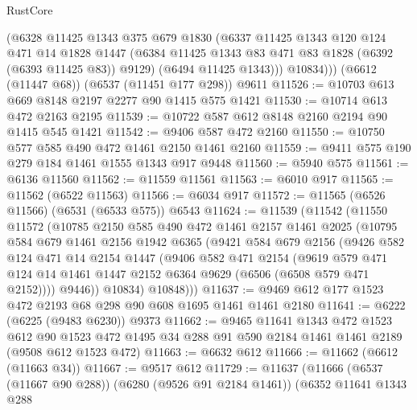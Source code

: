 \begin{lexlean}{RustCore}
\begin{coremodule}
          (@6328
            @11425
            @1343
            @375
            @679
            @1830
            (@6337
              @11425
              @1343
              @120
              @124
              @471
              @14
              @1828
              @1447
              (@6384 @11425 @1343 @83 @471 @83 @1828 (@6392 (@6393 @11425 @83)) @9129)
              (@6494 @11425 @1343)))
          @10834)))
    (@6612 (@11447 @68))
    (@6537 (@11451 @177 @298))
    @9611
@11526 := @10703 @613 @669 @8148 @2197 @2277 @90 @1415 @575 @1421
@11530 := @10714 @613 @472 @2163 @2195
@11539 := @10722 @587 @612 @8148 @2160 @2194 @90 @1415 @545 @1421
@11542 := @9406 @587 @472 @2160
@11550 := @10750 @577 @585 @490 @472 @1461 @2150 @1461 @2160
@11559 := @9411 @575 @190 @279 @184 @1461 @1555 @1343 @917 @9448
@11560 := @5940 @575
@11561 := @6136 @11560
@11562 := @11559 @11561
@11563 := @6010 @917
@11565 := @11562 (@6522 @11563)
@11566 := @6034 @917
@11572 := @11565 (@6526 @11566) (@6531 (@6533 @575)) @6543
@11624 := @11539
    (@11542
      (@11550
        @11572
        (@10785
          @2150
          @585
          @490
          @472
          @1461
          @2157
          @1461
          @2025
          (@10795
            @584
            @679
            @1461
            @2156
            @1942
            @6365
            (@9421
              @584
              @679
              @2156
              (@9426
                @582
                @124
                @471
                @14
                @2154
                @1447
                (@9406
                  @582
                  @471
                  @2154
                  (@9619
                    @579
                    @471
                    @124
                    @14
                    @1461
                    @1447
                    @2152
                    @6364
                    @9629
                    (@6506 (@6508 @579 @471 @2152))))
                @9446))
            @10834)
          @10848)))
@11637 := @9469 @612 @177 @1523 @472 @2193 @68 @298 @90 @608 @1695 @1461 @1461 @2180
@11641 := @6222 (@6225 (@9483 @6230)) @9373
@11662 := @9465
    @11641
    @1343
    @472
    @1523
    @612
    @90
    @1523
    @472
    @1495
    @34
    @288
    @91
    @590
    @2184
    @1461
    @1461
    @2189
    (@9508 @612 @1523 @472)
@11663 := @6632 @612
@11666 := @11662 (@6612 (@11663 @34))
@11667 := @9517 @612
@11729 := @11637
    (@11666
      (@6537 (@11667 @90 @288))
      (@6280 (@9526 @91 @2184 @1461))
      (@6352
        @11641
        @1343
        @288

\end{coremodule}
\end{lexlean}
